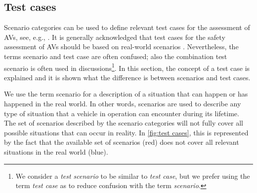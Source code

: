 \subsection{Test cases}
\label{sec:test cases}

Scenario categories can be used to define relevant test cases for the assessment of AVs, see, e.g., \cite{ploeg2018cetran,elrofai2016scenario}. It is generally acknowledged that test cases for the safety assessment of AVs should be based on real-world scenarios \cite{putz2017pegasus, roesener2016scenariobased, deGelder2017assessment}. Nevertheless, the terms scenario and test case are often confused; also the combination test scenario is often used in discussions\footnote{We consider a \emph{test scenario} to be similar to \emph{test case}, but we prefer using the term \emph{test case} as to reduce confusion with the term \emph{scenario}.}. In this section, the concept of a test case is explained and it is shown what the difference is between scenarios and test cases.

We use the term scenario for a description of a situation that can happen or has happened in the real world. In other words, scenarios are used to describe any type of situation that a vehicle in operation can encounter during its lifetime. The set of scenarios described by the scenario categories will not fully cover all possible situations that can occur in reality. In \cref{fig:test cases}, this is represented by the fact that the available set of scenarios (red) does not cover all relevant situations in the real world (blue).

